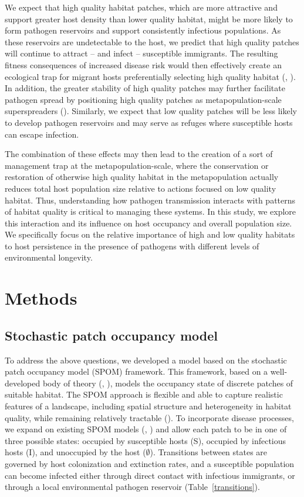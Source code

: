 \documentclass{article}
\begin{document}
We expect that high quality habitat patches, which are more attractive and support greater host density than lower quality habitat, might be more likely to form pathogen reservoirs and support consistently infectious populations.  As these reservoirs are undetectable to the host, we predict that high quality patches will continue to attract -- and infect -- susceptible immigrants.
The resulting fitness consequences of increased disease risk would then effectively create an ecological trap for migrant hosts preferentially selecting high quality habitat (\cite{Robertson2006}, \cite{Almberg2011}).  
In addition, the greater stability of high quality patches may further facilitate pathogen spread by positioning high quality patches as metapopulation-scale superspreaders (\cite{Paull2012}).  Similarly, we expect that low quality patches will be less likely to develop pathogen reservoirs and may serve as refuges where susceptible hosts can escape infection.

The combination of these effects may then lead to the creation of a sort of management trap at the metapopulation-scale, where the conservation or restoration of otherwise high quality habitat in the metapopulation actually reduces total host population size relative to actions focused on low quality habitat.
Thus, understanding how pathogen transmission interacts with patterns of habitat quality is critical to managing these systems.  In this study, we explore this interaction and its influence on host occupancy and overall population size.  We specifically focus on the relative importance of high and low quality habitats to host persistence in the presence of pathogens with different levels of environmental longevity. 

\section{Methods}
\label{methods}

\subsection{Stochastic patch occupancy model}

To address the above questions, we developed a model based on the stochastic patch occupancy model (SPOM) framework.
This framework, based on a well-developed body of theory (\cite{Hanski2003}, \cite{Ovaskainen2004}), models the occupancy state of discrete patches of suitable habitat.
The SPOM approach is flexible and able to capture realistic features of a landscape, including spatial structure and heterogeneity in habitat quality, while remaining relatively tractable (\cite{Ovaskainen2004}).
To incorporate disease processes, we expand on existing SPOM models (\cite{Hanski2003}, \cite{Ovaskainen2004}) and allow each patch to be in one of three possible states: occupied by susceptible hosts (S), occupied by infectious hosts (I), and unoccupied by the host ($\emptyset$).  
Transitions between states are governed by host colonization and extinction rates, and a susceptible population can become infected either through direct contact with infectious immigrants, or through a local environmental pathogen reservoir (Table~\ref{transitions}).
\end{document}
